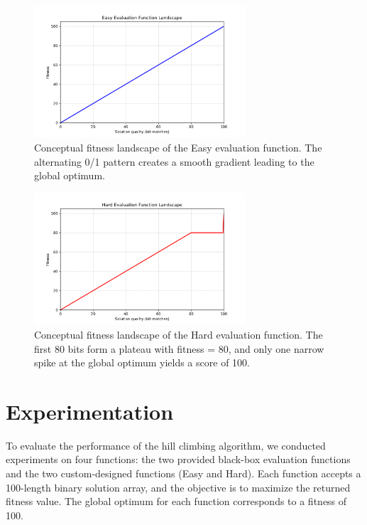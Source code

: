 \documentclass[11pt]{article}
\begin{document}
\begin{figure}[H]
    \centering
    \includegraphics[width=0.7\textwidth]{easy_landscape.png}
    \caption{Conceptual fitness landscape of the Easy evaluation function. 
    The alternating 0/1 pattern creates a smooth gradient leading to the global optimum.}
    \label{fig:easy-landscape}
\end{figure}

\begin{figure}[H]
    \centering
    \includegraphics[width=0.7\textwidth]{hard_landscape.png}
    \caption{Conceptual fitness landscape of the Hard evaluation function. 
    The first 80 bits form a plateau with fitness = 80, and only one narrow spike 
    at the global optimum yields a score of 100.}
    \label{fig:hard-landscape}
\end{figure}


\section{Experimentation}
\label{section-experimentation}

To evaluate the performance of the hill climbing algorithm, we conducted experiments on four functions: the two provided black-box evaluation functions and the two custom-designed functions (Easy and Hard). Each function accepts a 100-length binary solution array, and the objective is to maximize the returned fitness value. The global optimum for each function corresponds to a fitness of 100.  
\end{document}
